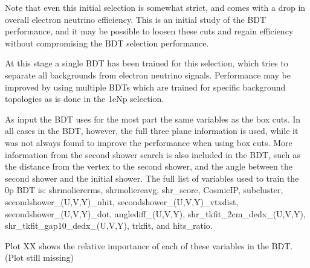 \documentclass[a4paper]{article}
\begin{document}
Note that even this initial selection is somewhat strict, and comes with a drop in overall electron neutrino efficiency.  This is an initial study of the BDT performance, and it may be possible to loosen these cuts and regain efficiency without compromising the BDT selection performance. 

At this stage a single BDT has been trained for this selection, which tries to separate all backgrounds from electron neutrino signals.  Performance may be improved by using multiple BDTs which are trained for specific background topologies as is done in the 1eNp selection. 

As input the BDT uses for the most part the same variables as the box cuts.  In all cases in the BDT, however, the full three plane information is used, while it was not always found to improve the performance when using box cuts.  More information from the second shower search is also included in the BDT, such as the distance from the vertex to the second shower, and the angle between the second shower and the initial shower. The full list of variables used to train the 0p BDT is: shrmoliererms, shrmoliereavg, shr\_score, CosmicIP, subcluster, secondshower\_(U,V,Y)\_nhit, secondshower\_(U,V,Y)\_vtxdist, secondshower\_(U,V,Y)\_dot, anglediff\_(U,V,Y), shr\_tkfit\_2cm\_dedx\_(U,V,Y), shr\_tkfit\_gap10\_dedx\_(U,V,Y), trkfit, and hits\_ratio.

Plot XX shows the relative importance of each of these variables in the BDT. (Plot still missing)
\end{document}
